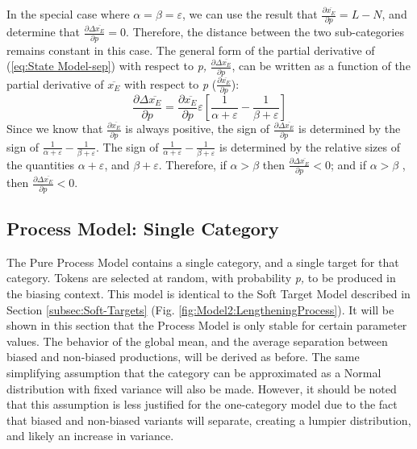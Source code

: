In the special case where $\alpha=\beta=\varepsilon$, we can use
the result that $\frac{\partial\overline{x_{E}}}{\partial p}=L-N$,
and determine that $\frac{\partial\Delta\overline{x_{E}}}{\partial p}=0$.
Therefore, the distance between the two sub-categories remains constant
in this case. The general form of the partial derivative of (\ref{eq:State Model-sep})
with respect to \emph{p,} $\frac{\partial\Delta\overline{x_{E}}}{\partial p}$,
can be written as a function of the partial derivative of $\overline{x_{E}}$
with respect to \emph{p} ($\frac{\partial\overline{x_{E}}}{\partial p}$):
\begin{equation}
\frac{\partial\Delta\overline{x_{E}}}{\partial p}=\frac{\partial\overline{x_{E}}}{\partial p}\varepsilon[\frac{1}{\alpha+\varepsilon}-\frac{1}{\beta+\varepsilon}]\label{eq: Model G: dsep/dp}
\end{equation}
Since we know that $\frac{\partial\overline{x_{E}}}{\partial p}$
is always positive, the sign of $\frac{\partial\Delta\overline{x_{E}}}{\partial p}$
is determined by the sign of $\frac{1}{\alpha+\varepsilon}-\frac{1}{\beta+\varepsilon}$.
The sign of $\frac{1}{\alpha+\varepsilon}-\frac{1}{\beta+\varepsilon}$
is determined by the relative sizes of the quantities $\alpha+\varepsilon$,
and $\beta+\varepsilon$. Therefore, if $\alpha>\beta$ then $\frac{\partial\Delta\overline{x_{E}}}{\partial p}<0$;
and if $\alpha>\beta$ , then $\frac{\partial\Delta\overline{x_{E}}}{\partial p}<0$.

\subsection{\label{subsec:Model-B:-Lengthening}Process Model: Single Category}

The Pure Process Model contains a single category, and a single target
for that category. Tokens are selected at random, with probability
\emph{p,} to be produced in the biasing context. This model is identical
to the Soft Target Model described in Section \ref{subsec:Soft-Targets}
(Fig. \ref{fig:Model2:LengtheningProcess}). It will be shown in this
section that the Process Model is only stable for certain parameter
values. The behavior of the global mean, and the average separation
between biased and non-biased productions, will be derived as before.
The same simplifying assumption that the category can be approximated
as a Normal distribution with fixed variance will also be made. However,
it should be noted that this assumption is less justified for the
one-category model due to the fact that biased and non-biased variants
will separate, creating a lumpier distribution, and likely an increase
in variance.

